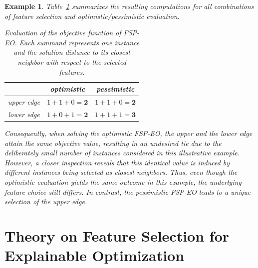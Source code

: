 \documentclass[11pt, a4paper]{article}
\newtheorem{example}{Example}
\newcommand{\fspeo}{FSP-EO\xspace}
\newcommand{\Regie}[1]{\todo[color=white, inline, author=Structure]{#1}}
\begin{document}
\begin{example}
Table~\ref{tab:exampleSk} summarizes the resulting computations for all combinations of feature selection and optimistic/pessimistic evaluation.

\begin{table}[h]
	\centering
	\begin{tabular}{c|c|c}
		& optimistic & pessimistic \\
		\hline
		upper edge & $1+1+0=\mathbf{2}$ & $1+1+0=\mathbf{2}$\\
		\hline
		lower edge & $1+0+1=\mathbf{2}$ & $1+1+1=\mathbf{3}$
	\end{tabular}
	\caption{Evaluation of the objective function of \fspeo. Each summand represents one instance and the solution distance to its closest neighbor with respect to the selected features.}
	\label{tab:exampleSk}
\end{table}


Consequently, when solving the optimistic \fspeo, the upper and the lower edge attain the same objective value, resulting in an undesired tie due to the deliberately small number of instances considered in this illustrative example. However, a closer inspection reveals that this identical value is induced by different instances being selected as closest neighbors. Thus, even though the optimistic evaluation yields the same outcome in this example, the underlying feature choice still differs. In contrast, the pessimistic \fspeo leads to a unique selection of the upper edge.


\end{example}



\section{Theory on Feature Selection for Explainable Optimization}
\label{sec:theory}

\end{document}
